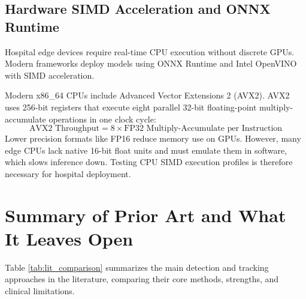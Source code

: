 \subsection{Hardware SIMD Acceleration and ONNX Runtime}
Hospital edge devices require real-time CPU execution without discrete GPUs. Modern frameworks deploy models using ONNX Runtime \cite{onnxruntime2021} and Intel OpenVINO \cite{openvino2023} with SIMD acceleration.

Modern x86\_64 CPUs include Advanced Vector Extensions 2 (AVX2). AVX2 uses 256-bit registers that execute eight parallel 32-bit floating-point multiply-accumulate operations in one clock cycle:
\begin{equation}
    \text{AVX2 Throughput} = 8 \times \text{FP32 Multiply-Accumulate per Instruction}
\end{equation}
Lower precision formats like FP16 reduce memory use on GPUs. However, many edge CPUs lack native 16-bit float units and must emulate them in software, which slows inference down. Testing CPU SIMD execution profiles is therefore necessary for hospital deployment.

\section{Summary of Prior Art and What It Leaves Open}
Table \ref{tab:lit_comparison} summarizes the main detection and tracking approaches in the literature, comparing their core methods, strengths, and clinical limitations.

\begin{table}[htbp]
\centering
\caption{Comparison of Object Detection, Tracking, and Census Methods}
\label{tab:lit_comparison}
\end{table}

